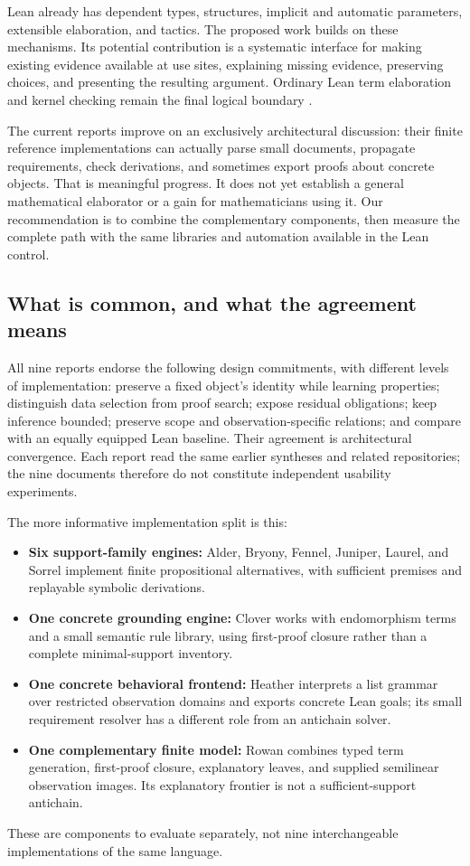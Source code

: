 \documentclass[11pt,letterpaper]{article}
\theoremstyle{definition}\newtheorem{definition}[proposition]{Definition}
\theoremstyle{remark}\newtheorem{remark}[proposition]{Remark}
\begin{document}
Lean already has dependent types, structures, implicit and automatic
parameters, extensible elaboration, and tactics. The proposed work builds
on these mechanisms. Its potential contribution is a systematic interface
for making existing evidence available at use sites, explaining missing
evidence, preserving choices, and presenting the resulting argument. Ordinary
Lean term elaboration and kernel checking remain the final logical boundary
\cite{lean-elab,lean-app}.

The current reports improve on an exclusively architectural discussion:
their finite reference implementations can actually parse small documents,
propagate requirements, check derivations, and sometimes export proofs about
concrete objects. That is meaningful progress. It does not yet establish a
general mathematical elaborator or a gain for mathematicians using it.
Our recommendation is to combine the complementary components, then measure
the complete path with the same libraries and automation available in the
Lean control.

\subsection{What is common, and what the agreement means}

All nine reports endorse the following design commitments, with different
levels of implementation: preserve a fixed object's identity while learning
properties; distinguish data selection from proof search; expose residual
obligations; keep inference bounded; preserve scope and observation-specific
relations; and compare with an equally equipped Lean baseline.
Their agreement is architectural convergence. Each report read the same
earlier syntheses and related repositories; the nine documents therefore
do not constitute independent usability experiments.

The more informative implementation split is this:
\begin{itemize}
\item \textbf{Six support-family engines:} Alder, Bryony, Fennel, Juniper,
Laurel, and Sorrel implement finite propositional alternatives, with sufficient
premises and replayable symbolic derivations.
\item \textbf{One concrete grounding engine:} Clover works with endomorphism
terms and a small semantic rule library, using first-proof closure rather
than a complete minimal-support inventory.
\item \textbf{One concrete behavioral frontend:} Heather interprets a list
grammar over restricted observation domains and exports concrete Lean goals;
its small requirement resolver has a different role from an antichain solver.
\item \textbf{One complementary finite model:} Rowan combines typed term
generation, first-proof closure, explanatory leaves, and supplied semilinear
observation images. Its explanatory frontier is not a sufficient-support
antichain.
\end{itemize}
These are components to evaluate separately, not nine interchangeable
implementations of the same language.
\end{document}
